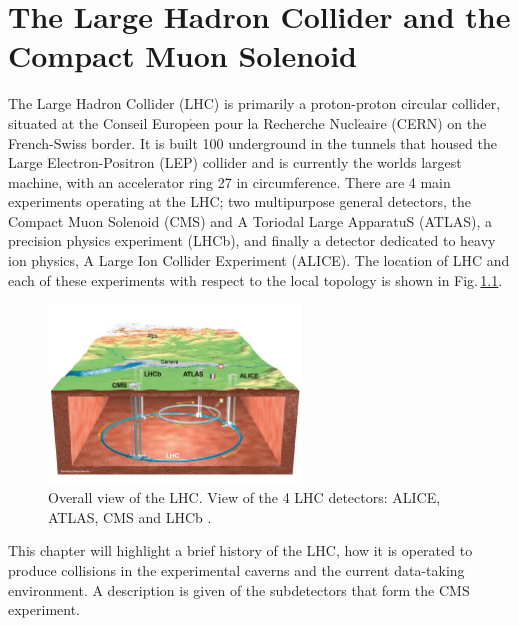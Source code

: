 \chapter{The Large Hadron Collider and the Compact Muon Solenoid}
\label{ch:LHCCMS}

The Large Hadron Collider (LHC) is primarily a proton-proton circular collider, situated at the Conseil Europ$\acute{\text{e}}$en pour la Recherche Nucl$\acute{\text{e}}$aire (CERN) on the French-Swiss border. 
It is built 100\m{} underground in the tunnels that housed the Large Electron-Positron (LEP) collider and is currently the worlds largest machine, with an accelerator ring 27\km{} in circumference. 
There are 4 main experiments operating at the LHC; two multipurpose general detectors, the Compact Muon Solenoid (CMS) and A Toriodal Large ApparatuS (ATLAS), a precision \bquark{} physics experiment (LHCb), and finally a detector dedicated to heavy ion physics, A Large Ion Collider Experiment (ALICE). 
The location of LHC and each of these experiments with respect to the local topology is shown in Fig.\,\ref{fig:LHCPicture}.
\begin{figure}[htpb]
	\centering
	\includegraphics[width=0.6\textwidth]{Figures/LHCPicture}
	\caption[Overall view of the LHC. View of the 4 LHC detectors: ALICE, ATLAS, CMS and LHCb]{Overall view of the LHC. View of the 4 LHC detectors: ALICE, ATLAS, CMS and LHCb \cite{LHCPicture}. }
	\label{fig:LHCPicture}
\end{figure}
This chapter will highlight a brief history of the LHC, how it is operated to produce collisions in the experimental caverns and the current data-taking environment. A description is given of the subdetectors that form the CMS experiment.




